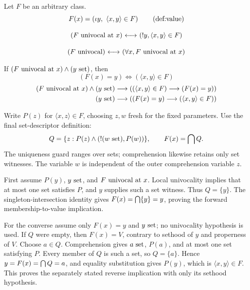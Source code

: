 \begin{definition}
Let $F$ be an arbitrary class.
\[
F(x) = \left(\iota y,\  \langle x,y\rangle\in F\right)
\labeltagd{def}{value}
\]
\end{definition}
\begin{definition}[univocal at]
\[
(F\mathrm{\ univocal\ at\ } x){\ \longleftrightarrow\ }(!y, \langle x,y\rangle \in F)
\label{def:univocalat}
\]
\end{definition}
\begin{definition}[univocal]
\[
(F\mathrm{\ univocal}){\ \longleftrightarrow\ } (\forall x, F\mathrm{\ univocal\ at\ } x)
\label{def:univocal}
\]
\end{definition}
\begin{theorem}
If $(F\mathrm{\ univocal\ at\ } x)\land(y\mathrm{\ set})$, then
\[
\left(F(x)=y\right)\iff\left(\langle x,y\rangle\in F\right)
\label{thm:pair in function}
\]
\begin{align*}
(F\mathrm{\ univocal\ at\ } x)\land(y\mathrm{\ set})
\longrightarrow
\left(
\left(\langle x,y\rangle\in F\right)
\longrightarrow
\left(F(x)=y\right)
\right)
\\
(y\mathrm{\ set})
\longrightarrow
\left(
\left(F(x)=y\right)
\longrightarrow
\left(\langle x,y\rangle\in F\right)
\right)
\end{align*}
\iffalse
\[
\mbox{x set!!??}
(F\univocalat x)
\implies
\left(
\left(
\left(F(x)=y\right)\land(y\set)
\right)
\iff\left(\langle x,y\rangle\in F\right)
\right)
\]
\fi
\end{theorem}
\Proof
Write $P(z)$ for $\langle x,z\rangle\in F$, choosing $z,w$ fresh
for the fixed parameters. Use the final set-descriptor definition:
\[
Q=\{z:P(z)\land(!(w\mathrm{\ set}),P(w))\},\qquad F(x)=\bigcap Q.
\]
The uniqueness guard ranges over sets; comprehension likewise retains
only set witnesses. The variable $w$ is independent of the outer
comprehension variable $z$.

First assume $P(y)$, $y\mathrm{\ set}$, and $F\mathrm{\ univocal\ at\ } x$. Local univocality
implies that at most one set satisfies $P$, and $y$ supplies such a
set witness. Thus $Q=\{y\}$. The singleton-intersection identity gives
$F(x)=\bigcap\{y\}=y$, proving the forward membership-to-value
implication.

For the converse assume only $F(x)=y$ and $y\mathrm{\ set}$; no univocality
hypothesis is used. If $Q$ were empty, then $F(x)=V$, contrary to
sethood of $y$ and properness of $V$. Choose $a\in Q$. Comprehension
gives $a\mathrm{\ set}$, $P(a)$, and at most one set satisfying $P$. Every
member of $Q$ is such a set, so $Q=\{a\}$. Hence
$y=F(x)=\bigcap Q=a$, and equality substitution gives $P(y)$,
which is $\langle x,y\rangle\in F$. This proves the separately
stated reverse implication with only its sethood hypothesis.
\Done

